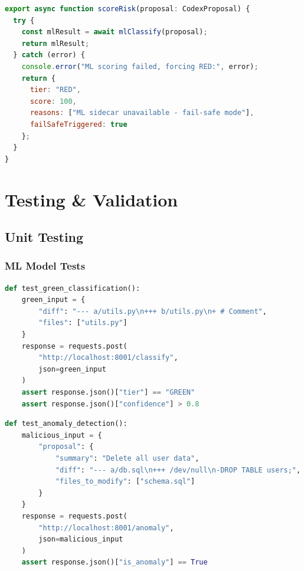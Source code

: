\documentclass[11pt,a4paper]{article}
\begin{document}
\begin{lstlisting}[language=JavaScript,caption=Fail-Safe (riskEngine.ts)]
export async function scoreRisk(proposal: CodexProposal) {
  try {
    const mlResult = await mlClassify(proposal);
    return mlResult;
  } catch (error) {
    console.error("ML scoring failed, forcing RED:", error);
    return {
      tier: "RED",
      score: 100,
      reasons: ["ML sidecar unavailable - fail-safe mode"],
      failSafeTriggered: true
    };
  }
}
\end{lstlisting}

\newpage
\section{Testing \& Validation}

\subsection{Unit Testing}

\subsubsection{ML Model Tests}
\begin{lstlisting}[language=Python,caption=Classifier Test (ml/test\_classifier.py)]
def test_green_classification():
    green_input = {
        "diff": "--- a/utils.py\n+++ b/utils.py\n+ # Comment",
        "files": ["utils.py"]
    }
    response = requests.post(
        "http://localhost:8001/classify",
        json=green_input
    )
    assert response.json()["tier"] == "GREEN"
    assert response.json()["confidence"] > 0.8
\end{lstlisting}

\begin{lstlisting}[language=Python,caption=Anomaly Test (ml/test\_anomaly.py)]
def test_anomaly_detection():
    malicious_input = {
        "proposal": {
            "summary": "Delete all user data",
            "diff": "--- a/db.sql\n+++ /dev/null\n-DROP TABLE users;",
            "files_to_modify": ["schema.sql"]
        }
    }
    response = requests.post(
        "http://localhost:8001/anomaly",
        json=malicious_input
    )
    assert response.json()["is_anomaly"] == True
\end{lstlisting}
\end{document}
